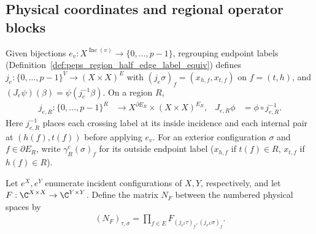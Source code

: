 \subsection{Physical coordinates and regional operator blocks}

\begin{definition}%
    \label{def:peps_parent_support_bond_coordinates}
    \leanok
    Given bijections $e_v:X^{\operatorname{Inc}(v)}\to\{0,\ldots,p-1\}$,
    regrouping endpoint labels (Definition~\ref{def:peps_region_half_edge_label_equiv})
    defines $j_e:\{0,\ldots,p-1\}^V\to(X\times X)^E$ with
    $(j_e\sigma)_f=(x_{h,f},x_{t,f})$ on $f=(t,h)$, and
    $(J_e\psi)(\beta)=\psi(j_e^{-1}\beta)$. On a region $R$,
    \begin{align}
        j_{e,R}:\{0,\ldots,p-1\}^R
         & \longrightarrow X^{\partial E_R}\times(X\times X)^{E_R},
         & J_{e,R}\phi                                              & =\phi\circ j_{e,R}^{-1}.
        \label{eq:peps_parent_support_bond_coordinates}
    \end{align}
    Here $j_{e,R}^{-1}$ places each crossing label at its inside incidence and
    each internal pair at $(h(f),t(f))$ before applying $e_v$. For an exterior
    configuration $\sigma$ and $f\in\partial E_R$, write $\gamma^e_R(\sigma)_f$
    for its outside endpoint label ($x_{h,f}$ if $t(f)\in R$, $x_{t,f}$ if
    $h(f)\in R$).
\end{definition}

\begin{definition}%
    \label{def:peps_parent_support_numbered_operator}
    \leanok
    Let $e^X,e^Y$ enumerate incident configurations of $X,Y$,
    respectively, and let $F:\C^{X\times X}\to\C^{Y\times Y}$.
    Define the matrix $N_F$ between the numbered physical spaces by
    \begin{align}
        (N_F)_{\tau,\sigma}
        =\prod_{f\in E}F_{(j_{e^Y}\tau)_f,(j_{e^X}\sigma)_f}.
        \label{eq:peps_parent_support_numbered_operator}
    \end{align}
\end{definition}

